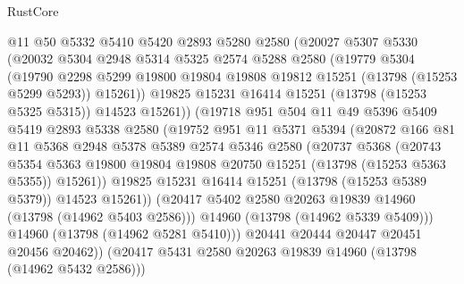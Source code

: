 \begin{lexlean}{RustCore}
\begin{coremodule}
              @11
              @50
              @5332
              @5410
              @5420
              @2893
              @5280
              @2580
              (@20027
                @5307
                @5330
                (@20032
                  @5304
                  @2948
                  @5314
                  @5325
                  @2574
                  @5288
                  @2580
                  (@19779
                    @5304
                    (@19790
                      @2298
                      @5299
                      @19800
                      @19804
                      @19808
                      @19812
                      @15251
                      (@13798 (@15253 @5299 @5293))
                      @15261))
                  @19825
                  @15231
                  @16414
                  @15251
                  (@13798 (@15253 @5325 @5315))
                  @14523
                  @15261))
              (@19718
                @951
                @504
                @11
                @49
                @5396
                @5409
                @5419
                @2893
                @5338
                @2580
                (@19752
                  @951
                  @11
                  @5371
                  @5394
                  (@20872
                    @166
                    @81
                    @11
                    @5368
                    @2948
                    @5378
                    @5389
                    @2574
                    @5346
                    @2580
                    (@20737
                      @5368
                      (@20743
                        @5354
                        @5363
                        @19800
                        @19804
                        @19808
                        @20750
                        @15251
                        (@13798 (@15253 @5363 @5355))
                        @15261))
                    @19825
                    @15231
                    @16414
                    @15251
                    (@13798 (@15253 @5389 @5379))
                    @14523
                    @15261))
                (@20417 @5402 @2580 @20263 @19839 @14960 (@13798 (@14962 @5403 @2586)))
                @14960
                (@13798 (@14962 @5339 @5409)))
              @14960
              (@13798 (@14962 @5281 @5410)))
            @20441
            @20444
            @20447
            @20451
            @20456
            @20462))
        (@20417 @5431 @2580 @20263 @19839 @14960 (@13798 (@14962 @5432 @2586)))

\end{coremodule}
\end{lexlean}
